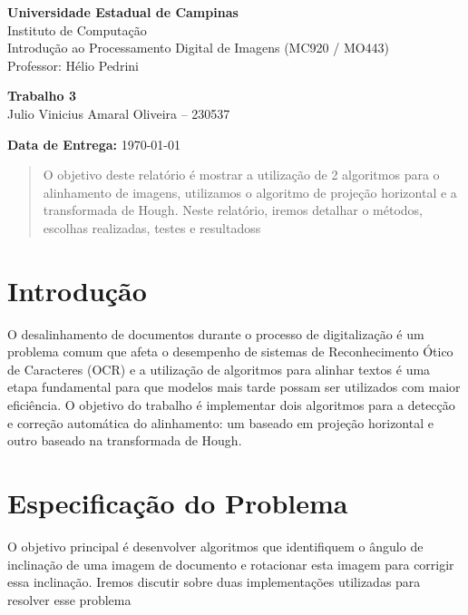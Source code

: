 \documentclass{article}
\begin{document}
\begin{center}
    \Large \textbf{Universidade Estadual de Campinas} \\
    \large Instituto de Computação \\
    \vspace{0.5cm}
    \large Introdução ao Processamento Digital de Imagens (MC920 / MO443) \\
    \large Professor: Hélio Pedrini
\end{center}

\vspace{2cm}

\begin{center}
    \LARGE \textbf{Trabalho 3} \\
    \vspace{0.5cm}
    \Large Julio Vinicius Amaral Oliveira – 230537
\end{center}

\vspace{2cm}

\begin{flushright}
    \large \textbf{Data de Entrega:} \today
\end{flushright}

\newpage


\begin{abstract}
O objetivo deste relatório é mostrar a utilização de 2 algoritmos para o alinhamento de imagens, utilizamos o algoritmo de projeção horizontal e a transformada de Hough. Neste relatório, iremos detalhar o métodos, escolhas realizadas, testes e resultadoss
\end{abstract}

\section{Introdução}
O desalinhamento de documentos durante o processo de digitalização é um problema comum que afeta o desempenho de sistemas de Reconhecimento Ótico de Caracteres (OCR) e a utilização de algoritmos para alinhar textos é uma etapa fundamental para que modelos mais tarde possam ser utilizados com maior eficiência. O objetivo do trabalho é implementar dois algoritmos para a detecção e correção automática do alinhamento: um baseado em projeção horizontal e outro baseado na transformada de Hough.

\section{Especificação do Problema}
O objetivo principal é desenvolver algoritmos que identifiquem o ângulo de inclinação de uma imagem de documento e rotacionar esta imagem para corrigir essa inclinação. Iremos discutir sobre duas implementações utilizadas para resolver esse problema
\end{document}
